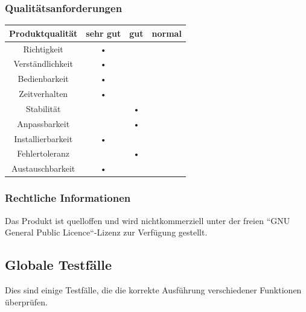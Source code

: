 \subsubsection{Qualitätsanforderungen}
\begin{center}
\begin{tabular}{|c|c|c|c|}
\hline 
\textbf{Produktqualität} & \textbf{sehr gut} & \textbf{gut} & \textbf{normal} \\ 
\hline 
Richtigkeit & • && \\ 
\hline 
Verständlichkeit & • & & \\ 
\hline 
Bedienbarkeit & • & & \\ 
\hline 
Zeitverhalten & • & & \\ 
\hline 
Stabilität & & • & \\ 
\hline 
Anpassbarkeit & & • & \\ 
\hline 
Installierbarkeit & • & & \\ 
\hline 
Fehlertoleranz & & • & \\ 
\hline 
Austauschbarkeit & • & & \\ 
\hline 
\end{tabular}
\end{center}


\subsubsection{Rechtliche Informationen}
Das Produkt ist quelloffen und wird nichtkommerziell unter der freien ``GNU General Public Licence``-Lizenz zur Verfügung gestellt. 

\newpage
\subsection{Globale Testfälle}
Dies sind einige Testfälle, die die korrekte Ausführung verschiedener Funktionen überprüfen.

